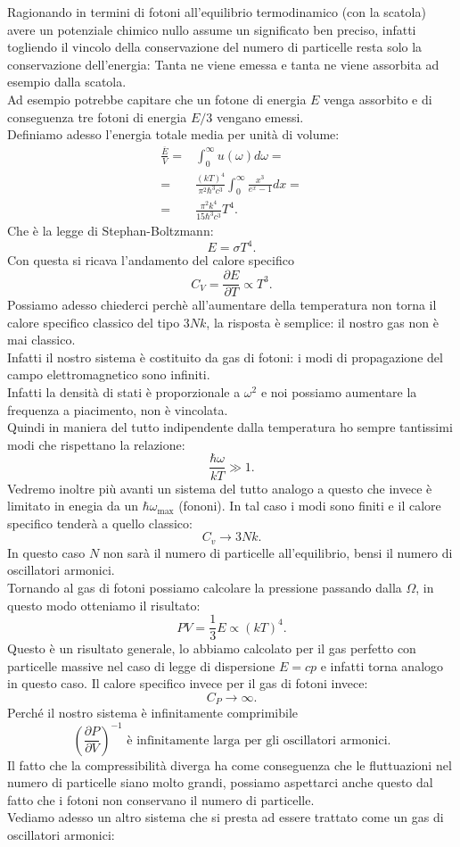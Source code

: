Ragionando in termini di fotoni all'equilibrio termodinamico (con la scatola) avere un potenziale chimico nullo assume un significato ben preciso, infatti togliendo il vincolo della conservazione del numero di particelle resta solo la conservazione dell'energia: Tanta ne viene emessa e tanta ne viene assorbita ad esempio dalla scatola.\\
Ad esempio potrebbe capitare che un fotone di energia $E$ venga assorbito e di conseguenza tre fotoni di energia $E /3$ vengano emessi.\\
Definiamo adesso l'energia totale media per unità di volume:
\begin{align}
	\frac{\overline{E}}{V}=& \int_{0}^{\infty} u ( \omega ) d\omega  =\\
	=&\frac{\left( kT \right) ^{4}}{\pi^2\hbar^3c^3}\int_{0}^{\infty} \frac{x^3}{e^{x}-1}dx =\\ \label{eq:energia-totale-media-fotoni}
	=&\frac{\pi^2 k^{4}}{15 \hbar^3 c^3}T^{4}
.\end{align}
Che è la legge di Stephan-Boltzmann:
\[
	E = \sigma T^{4}
.\] 
Con questa si ricava l'andamento del calore specifico
\[
	C_{V} = \frac{\partial E}{\partial T} \propto T^{3}
.\] 
Possiamo adesso chiederci perchè all'aumentare della temperatura non torna il calore specifico classico del tipo $3Nk$, la risposta è semplice: il nostro gas non è mai classico.\\
Infatti il nostro sistema è costituito da gas di fotoni: i modi di propagazione del campo elettromagnetico sono infiniti. \\
Infatti la densità di stati è proporzionale a $\omega ^2$ e noi possiamo aumentare la frequenza a piacimento, non è vincolata.\\
Quindi in maniera del tutto indipendente dalla temperatura ho sempre tantissimi modi che rispettano la relazione:
\[
	\frac{\hbar\omega }{kT}\gg 1
.\] 
Vedremo inoltre più avanti un sistema del tutto analogo a questo che invece è limitato in enegia da un $\hbar\omega _{\text{max}}$ (fononi).
In tal caso i modi sono finiti e il calore specifico tenderà a quello classico:
\[
	C_{v} \to 3Nk
.\] 
In questo caso $N$ non sarà il numero di particelle all'equilibrio, bensi il numero di oscillatori armonici.\\
Tornando al gas di fotoni possiamo calcolare la pressione passando dalla $\Omega $, in questo modo otteniamo il risultato:
\[
	PV = \frac{1}{3}E \propto \left( kT \right) ^{4}
.\] 
Questo è un risultato generale, lo abbiamo calcolato per il gas perfetto con particelle massive nel caso di legge di dispersione $E = cp$ e infatti torna analogo in questo caso.
Il calore specifico invece per il gas di fotoni invece:
\[
	C_{P} \to \infty
.\] 
Perché il nostro sistema è infinitamente comprimibile
\[
	\left( \frac{\partial P}{\partial V}  \right) ^{-1} 
	\text{ è infinitamente larga per gli oscillatori armonici}
.\] 
Il fatto che la compressibilità diverga ha come conseguenza che le fluttuazioni nel numero di particelle siano molto grandi, possiamo aspettarci anche questo dal fatto che i fotoni non conservano il numero di particelle.\\
Vediamo adesso un altro sistema che si presta ad essere trattato come un gas di oscillatori armonici:

